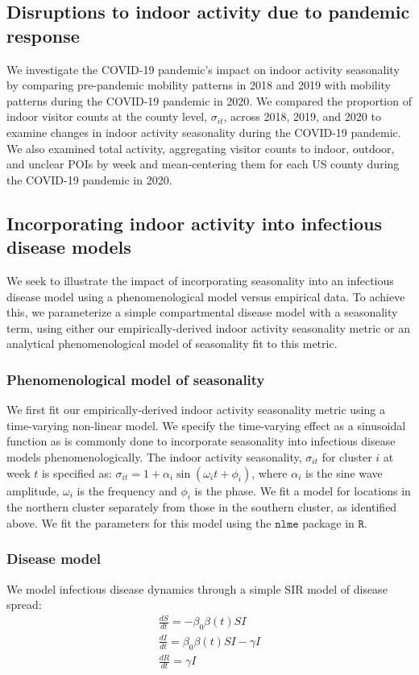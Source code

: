 \documentclass{article}
\begin{document}
\subsection*{Disruptions to indoor activity due to pandemic response}
We investigate the COVID-19 pandemic's impact on indoor activity seasonality by comparing pre-pandemic mobility patterns in 2018 and 2019 with mobility patterns during the COVID-19 pandemic in 2020. We compared the proportion of indoor visitor counts at the county level, $\sigma_{it}$, across 2018, 2019, and 2020 to examine changes in indoor activity seasonality during the COVID-19 pandemic. We also examined total activity, aggregating visitor counts to indoor, outdoor, and unclear POIs by week and mean-centering them for each US county during the COVID-19 pandemic in 2020.

\subsection*{Incorporating indoor activity into infectious disease models}
We seek to illustrate the impact of incorporating seasonality into an infectious disease model using a phenomenological model versus empirical data. To achieve this, we parameterize a simple compartmental disease model with a seasonality term, using either our empirically-derived indoor activity seasonality metric or an analytical phenomenological model of seasonality fit to this metric.

\subsubsection*{Phenomenological model of seasonality}
We first fit our empirically-derived indoor activity seasonality metric using a time-varying non-linear model. We specify the time-varying effect as a sinusoidal function as is commonly done to incorporate seasonality into infectious disease models phenomenologically. The indoor activity seasonality, $\sigma_{it}$ for cluster $i$ at week $t$ is specified as:
$\sigma_{it} = 1 + \alpha_i \sin(\omega_i t + \phi_i)$, where $\alpha_i$ is the sine wave amplitude, $\omega_i$ is the frequency and $\phi_i$ is the phase. We fit a model for locations in the northern cluster separately from those in the southern cluster, as identified above. We fit the parameters for this model using the $\texttt{nlme}$ package in $\texttt{R}$.

\subsubsection*{Disease model}
We model infectious disease dynamics through a simple SIR model of disease spread:
\begin{gather*}
    \frac{dS}{dt} = -\beta_0\beta(t) SI\\
    \frac{dI}{dt} = \beta_0 \beta(t) SI - \gamma I\\
    \frac{dR}{dt} = \gamma I\\
\end{gather*}
\end{document}
